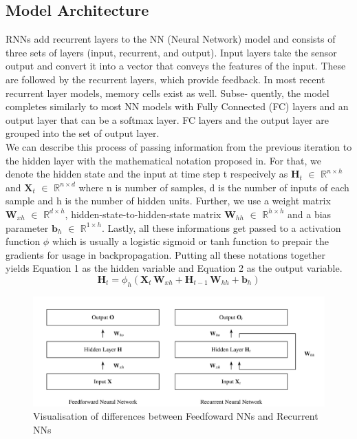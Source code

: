 \documentclass{article}
\begin{document}
\subsection{Model Architecture}
RNNs add recurrent layers to the NN (Neural Network)
model and consists of three sets of layers (input, recurrent, and output).
Input layers take the sensor output and convert it into a vector
that conveys the features of the input. These are followed by
the recurrent layers, which provide feedback. In most recent
recurrent layer models, memory cells exist as well. Subse-
quently, the model completes similarly to most NN models
with Fully Connected (FC) layers and an output layer that can
be a softmax layer. FC layers and the output layer are grouped
into the set of output layer. \\

We can describe this process of passing information from the previous iteration to the hidden layer
with the mathematical notation proposed in. For that, we denote the hidden state and the input
at time step t respecively as $\mathbf{H}_t$ $\in$ $\mathbb{R}^{n \times h}$ and $\mathbf{X}_t$ $\in$ $\mathbb{R}^{n \times d}$ where n is number of samples, d is the
number of inputs of each sample and h is the number of hidden units. Further, we use a weight matrix
$\mathbf{W}_{xh}$ $\in$ $\mathbb{R}^{d \times h}$, hidden-state-to-hidden-state matrix $\mathbf{W}_{hh}$ $\in$ $\mathbb{R}^{h \times h}$ and a bias parameter $\mathbf{b}_h$ $\in$ $\mathbb{R}^{1 \times h}$.
Lastly, all these informations get passed to a activation function $\phi$ which is usually a logistic sigmoid
or tanh function to prepair the gradients for usage in backpropagation. Putting all these notations
together yields Equation 1 as the hidden variable and Equation 2 as the output variable.
\begin{equation}
  \mathbf{H}_t = \phi_h(\mathbf{X}_t\,\mathbf{W}_{xh} + \mathbf{H}_{t-1}\,\mathbf{W}_{hh} + \mathbf{b}_h)
\end{equation}

\begin{figure}[h]
  \centering
  \includegraphics*[scale=0.5]{Figs/figure_1.png}
  \caption{Visualisation of differences between Feedfoward NNs and Recurrent NNs}
\end{figure}
\end{document}
